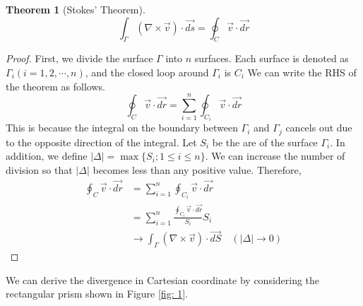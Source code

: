 \documentclass[letterpaper, 12pt]{article}
\theoremstyle{custom}
\newtheorem*{theorem}{Theorem}
\begin{document}
\bigskip

\begin{theorem}[Stokes' Theorem]
  \begin{equation*}
    \int_{\Gamma} \left( \nabla \times \vec{v} \right) \cdot \vec{ds} = \oint_{C} \vec{v} \cdot \vec{dr}
  \end{equation*}
\end{theorem}
\begin{proof}
  First, we divide the surface $\Gamma$ into $n$ surfaces. Each surface is denoted as $\Gamma_i (i=1,2,\cdots , n)$, 
  and the closed loop around $\Gamma_i$ is $C_i$
  We can write the RHS of the theorem as follows.
  \begin{equation*}
    \oint_{C} \vec{v} \cdot \vec{dr} = 
    \sum_{i=1}^{n} \oint_{C_i} \vec{v} \cdot \vec{dr}
  \end{equation*}
  This is because the integral on the boundary between $\Gamma_i$ and $\Gamma_j$ cancels out due to the opposite direction of the integral.
  Let $S_i$ be the are of the surface $\Gamma_i$. In addition, we define $| \Delta |=\max \{ S_i;1 \leq i \leq n \}$.
  We can increase the number of division so that $| \Delta |$ becomes less than any positive value. Therefore,
  \begin{align*}
    \oint_{C} \vec{v} \cdot \vec{dr} 
    &= \sum_{i=1}^{n} \oint_{C_i} \vec{v} \cdot \vec{dr}\\
    &= \sum_{i=1}^{n} \frac{\displaystyle \oint_{C_i} \vec{v} \cdot \vec{dr}}{S_i} S_i\\
    &\rightarrow \int_{\Gamma} \left( \nabla \times \vec{v} \right) \cdot \vec{dS} \quad (|\Delta| \rightarrow 0)
  \end{align*}
\end{proof}

\bigskip

We can derive the divergence in Cartesian coordinate by considering the rectangular prism shown in Figure \ref{fig: 1}.
\end{document}
